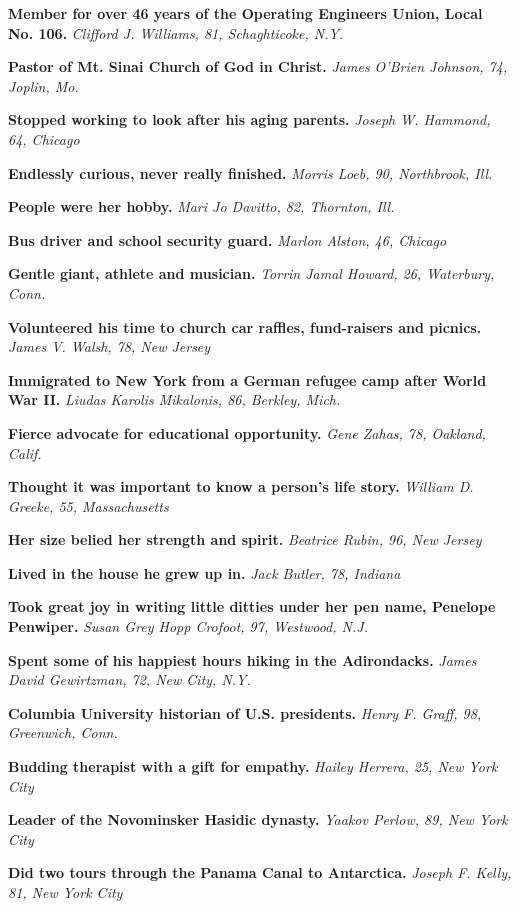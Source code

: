 \textbf{Member for over 46 years of the Operating Engineers Union, Local
No. 106.} \emph{Clifford J. Williams, 81, Schaghticoke, N.Y.}

\textbf{Pastor of Mt. Sinai Church of God in Christ.} \emph{James
O'Brien Johnson, 74, Joplin, Mo.}

\textbf{Stopped working to look after his aging parents.} \emph{Joseph
W. Hammond, 64, Chicago}

\textbf{Endlessly curious, never really finished.} \emph{Morris Loeb,
90, Northbrook, Ill.}

\textbf{People were her hobby.} \emph{Mari Jo Davitto, 82, Thornton,
Ill.}

\textbf{Bus driver and school security guard.} \emph{Marlon Alston, 46,
Chicago}

\textbf{Gentle giant, athlete and musician.} \emph{Torrin Jamal Howard,
26, Waterbury, Conn.}

\textbf{Volunteered his time to church car raffles, fund-raisers and
picnics.} \emph{James V. Walsh, 78, New Jersey}

\textbf{Immigrated to New York from a German refugee camp after World
War II.} \emph{Liudas Karolis Mikalonis, 86, Berkley, Mich.}

\textbf{Fierce advocate for educational opportunity.} \emph{Gene Zahas,
78, Oakland, Calif.}

\textbf{Thought it was important to know a person's life story.}
\emph{William D. Greeke, 55, Massachusetts}

\textbf{Her size belied her strength and spirit.} \emph{Beatrice Rubin,
96, New Jersey}

\textbf{Lived in the house he grew up in.} \emph{Jack Butler, 78,
Indiana}

\textbf{Took great joy in writing little ditties under her pen name,
Penelope Penwiper.} \emph{Susan Grey Hopp Crofoot, 97, Westwood, N.J.}

\textbf{Spent some of his happiest hours hiking in the Adirondacks.}
\emph{James David Gewirtzman, 72, New City, N.Y.}

\textbf{Columbia University historian of U.S. presidents.} \emph{Henry
F. Graff, 98, Greenwich, Conn.}

\textbf{Budding therapist with a gift for empathy.} \emph{Hailey
Herrera, 25, New York City}

\textbf{Leader of the Novominsker Hasidic dynasty.} \emph{Yaakov Perlow,
89, New York City}

\textbf{Did two tours through the Panama Canal to Antarctica.}
\emph{Joseph F. Kelly, 81, New York City}

